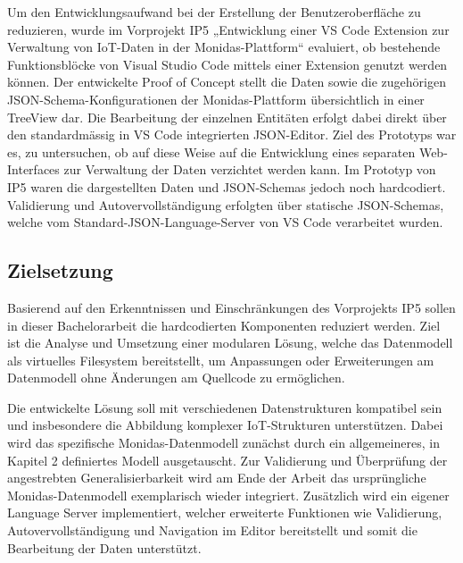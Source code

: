 
Um den Entwicklungsaufwand bei der Erstellung der Benutzeroberfläche zu reduzieren, wurde im Vorprojekt IP5 „Entwicklung einer VS Code Extension zur Verwaltung von IoT-Daten in der Monidas-Plattform“ evaluiert, ob bestehende Funktionsblöcke von Visual Studio Code mittels einer Extension genutzt werden können. Der entwickelte Proof of Concept stellt die Daten sowie die zugehörigen JSON-Schema-Konfigurationen der Monidas-Plattform übersichtlich in einer TreeView dar. Die Bearbeitung der einzelnen Entitäten erfolgt dabei direkt über den standardmässig in VS Code integrierten JSON-Editor. Ziel des Prototyps war es, zu untersuchen, ob auf diese Weise auf die Entwicklung eines separaten Web-Interfaces zur Verwaltung der Daten verzichtet werden kann. Im Prototyp von IP5 waren die dargestellten Daten und JSON-Schemas jedoch noch hardcodiert. Validierung und Autovervollständigung erfolgten über statische JSON-Schemas, welche vom Standard-JSON-Language-Server von VS Code verarbeitet wurden. 

\subsection{Zielsetzung}
Basierend auf den Erkenntnissen und Einschränkungen des Vorprojekts IP5 sollen in dieser Bachelorarbeit die hardcodierten Komponenten reduziert werden. Ziel ist die Analyse und Umsetzung einer modularen Lösung, welche das Datenmodell als virtuelles Filesystem bereitstellt, um Anpassungen oder Erweiterungen am Datenmodell ohne Änderungen am Quellcode zu ermöglichen.

Die entwickelte Lösung soll mit verschiedenen Datenstrukturen kompatibel sein und insbesondere die Abbildung komplexer IoT-Strukturen unterstützen. Dabei wird das spezifische Monidas-Datenmodell zunächst durch ein allgemeineres, in Kapitel 2 definiertes Modell ausgetauscht. Zur Validierung und Überprüfung der angestrebten Generalisierbarkeit wird am Ende der Arbeit das ursprüngliche Monidas-Datenmodell exemplarisch wieder integriert. Zusätzlich wird ein eigener Language Server implementiert, welcher erweiterte Funktionen wie Validierung, Autovervollständigung und Navigation im Editor bereitstellt und somit die Bearbeitung der Daten  unterstützt.

